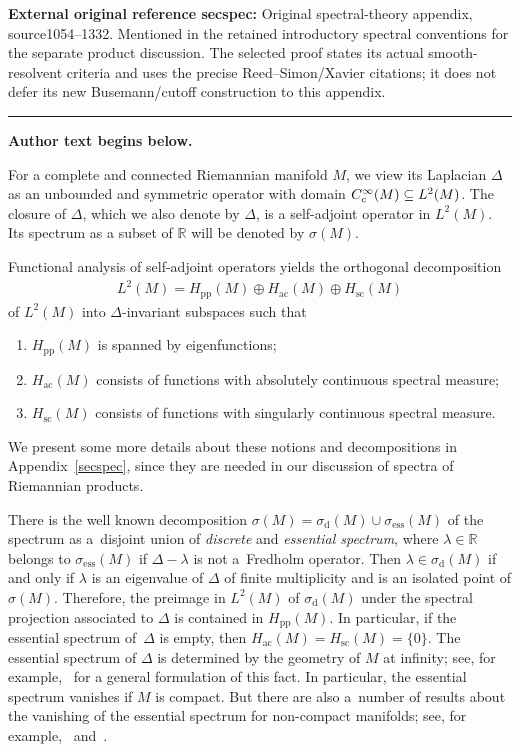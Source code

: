 \documentclass[11pt]{article}
\numberwithin{equation}{section}
\numberwithin{equation}{section}
\DeclareMathOperator{\ess}{ess}
\def\p{\mathrm{pp}}
\def\d{\mathrm d}
\def\ac{\mathrm{ac}}
\def\sc{\mathrm{sc}}
\def\R{\mathbb R}
\begin{document}
\noindent\textbf{External original reference secspec:} Original spectral-theory appendix, source1054–1332. Mentioned in the retained introductory spectral conventions for the separate product discussion. The selected proof states its actual smooth-resolvent criteria and uses the precise Reed–Simon/Xavier citations; it does not defer its new Busemann/cutoff construction to this appendix.\par
\medskip\hrule\medskip\noindent\textbf{Author text begins below.}\par
\setcounter{section}{1}
For a complete and connected Riemannian manifold $M$, we view its Laplacian $\Delta$
as an unbounded and symmetric operator with domain $C^\infty_{\rm c}(M) \subseteq L^2(M)$.
The closure of $\Delta$, which we also denote by $\Delta$, is a self-adjoint operator in $L^2(M)$.
Its spectrum as a subset of $\R$ will be denoted by $\sigma(M)$.

Functional analysis of self-adjoint operators yields the orthogonal decomposition
\begin{align*}%
L^2(M) = H_{\p}(M) \oplus H_{\ac}(M) \oplus H_{\sc}(M)
\end{align*}
of $L^2(M)$ into $\Delta$-invariant subspaces such that
\begin{enumerate}\itemsep=0pt
\item[(1)] $H_{\p}(M)$ is spanned by eigenfunctions;
\item[(2)] $H_{\ac}(M)$ consists of functions with absolutely continuous spectral measure;
\item[(3)] $H_{\sc}(M)$ consists of functions with singularly continuous spectral measure.
\end{enumerate}
We present some more details about these notions and decompositions in Appendix~\ref{secspec},
since they are needed in our discussion of spectra of Riemannian products.

There is the well known decomposition $\sigma(M)=\sigma_{\d}(M)\cup\sigma_{\ess}(M)$ of the spectrum
as a~disjoint union of \emph{discrete} and \emph{essential spectrum},
where $\lambda\in\R$ belongs to $\sigma_{\ess}(M)$ if $\Delta-\lambda$ is not a~Fredholm operator.
Then $\lambda\in\sigma_{\d}(M)$ if and only if $\lambda$ is an eigenvalue of $\Delta$
of finite multiplicity and is an isolated point of $\sigma(M)$.
Therefore, the preimage in $L^2(M)$ of $\sigma_{\d}(M)$ under the spectral projection associated to $\Delta$
is contained in $H_{\p}(M)$.
In particular, if the essential spectrum of~$\Delta$ is empty, then $H_{\ac}(M)=H_{\sc}(M)=\{0\}$.
The essential spectrum of $\Delta$ is determined by the geometry of $M$ at infinity;
see, for example,~\cite[Proposition 3.6]{BMM17} for a general formulation of this fact.
In particular, the essential spectrum vanishes if $M$ is compact.
But there are also a~number of results about the vanishing of the essential spectrum
for non-compact manifolds;
see, for example,~\cite[Theorems 1.1 and 1.2]{BLM10} and~\cite[Examples 3.7]{BMM17}.
\end{document}
